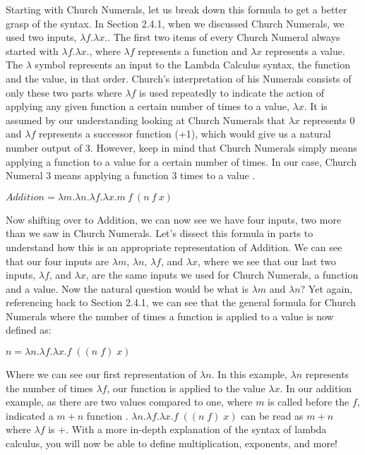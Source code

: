 \documentclass{article}
\begin{document}
\noindent 
Starting with Church Numerals, let us break down this formula to get a better grasp of the syntax. In Section 2.4.1, when we discussed Church Numerals, we used two inputs, $\lambda f.\lambda x.$. The first two items of every Church Numeral always started with $\lambda f.\lambda x.$, where $\lambda f$ represents a function and $\lambda x$ represents a value. The $\lambda$ symbol represents an input to the Lambda Calculus syntax, the function and the value, in that order. Church's interpretation of his Numerals consists of only these two parts where $\lambda f$ is used repeatedly to indicate the action of applying any given function a certain number of times to a value, $\lambda x$. It is assumed by our understanding looking at Church Numerals that $\lambda x$ represents 0 and $\lambda f$ represents a successor function (+1), which would give us a natural number output of 3. However, keep in mind that Church Numerals simply means applying a function to a value for a certain number of times. In our case, Church Numeral 3 means applying a function 3 times to a value \cite{CE}.

\begin{center}
 $ Addition = \lambda m.\lambda n.\lambda f.\lambda x. m\ f\ (n\ f\ x)$ \\
\end{center}

\medskip\noindent
Now shifting over to Addition, we can now see we have four inputs, two more than we saw in Church Numerals. Let's dissect this formula in parts to understand how this is an appropriate representation of Addition. We can see that our four inputs are $\lambda m$, $\lambda n$, $\lambda f$, and $\lambda x$, where we see that our last two inputs, $\lambda f$, and $\lambda x$, are the same inputs we used for Church Numerals, a function and a value. Now the natural question would be what is $\lambda m$ and $\lambda n$? Yet again, referencing back to Section 2.4.1, we can see that the general formula for Church Numerals where the number of times a function is applied to a value is now defined as:

\begin{center}
   $ n = \lambda n. \lambda f. \lambda x.f \; ((n \; f) \; x)$
\end{center}

\noindent
Where we can see our first representation of $\lambda n$. In this example, $\lambda n$ represents the number of times $\lambda f$, our function is applied to the value $\lambda x$. In our addition example, as there are two values compared to one, where $m$ is called before the $f$, indicated a $m+n$ function \cite{CE}. $\lambda n. \lambda f. \lambda x.f \; ((n \; f) \; x)$ can be read as $m + n$ where $\lambda f$ is +. With a more in-depth explanation of the syntax of lambda calculus, you will now be able to define multiplication, exponents, and more!
\end{document}
